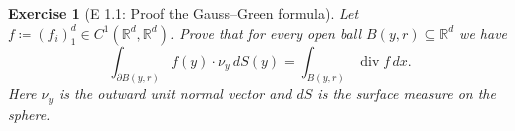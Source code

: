 \documentclass{report}
\theoremstyle{tommy}
\newtheorem{ex}[defn]{Exercise}
\renewcommand\div{\operatorname{div}}
\begin{document}
    

  \begin{ex}[E 1.1: Proof the Gauss–Green formula]
    Let \(f \coloneqq (f_i)_1^d \in C^1(\mathbb{R}^d, \mathbb{R}^d)\). Prove that for every open ball \(B(y, r) \subseteq \mathbb{R}^d\) we have \[\int_{\partial B(y, r)} f(y) \cdot \nu_y \, dS(y) = \int_{B(y, r)}\div f \, dx.\]
    Here \(\nu_y\) is the outward unit normal vector and \(dS\) is the surface measure on the sphere.
  \end{ex}
\end{document}
